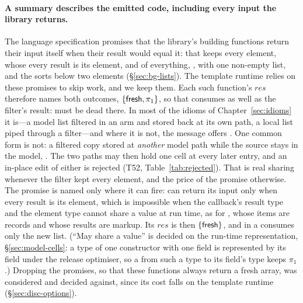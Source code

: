 \paragraph{A summary describes the emitted code, including every input the library returns.} The
language specification promises that the library's building functions return their input itself when
their result would equal it:  that keeps every element,  whose every result is
\code{===} its element,  and  of everything, ,  with
one non-empty list,  and the sorts below two elements (\S\ref{sec:bg-lists}). The template
runtime relies on these promises to skip work, and we keep them. Each such function's $\mathit{res}$
therefore names both outcomes, $\{\mathsf{fresh}, \pi_1\}$, so that  consumes
 as well as the filter's result:  must be dead there. In most of the idioms of
Chapter~\ref{sec:idioms} it is---a model list filtered in an  arm and stored back at its own
path, a local list piped through a filter---and where it is not, the message offers . One
common form is not: a filtered copy stored at \emph{another} model path while the source stays in the
model, . The two paths may then hold one cell at every
later entry, and an in-place edit of either is rejected (T52, Table~\ref{tab:rejected}). That is real
sharing whenever the filter kept every element, and the price of the promise otherwise. The promise is
named only where it can fire:  can return its input only when every result is its element, which is impossible when
the callback's result type and the element type cannot share a value at run time, as for
, whose items are records and whose results are markup. Its
$\mathit{res}$ is then $\{\mathsf{fresh}\}$, and  in a
 consumes only the new list. (``May share a value'' is decided on the run-time
representation, \S\ref{sec:model-cells}: a type of one constructor with one field is represented by its
field under the release optimiser, so a  from such a type to its field's type keeps $\pi_1$.)
Dropping the promises, so
that these functions always return a fresh array, was considered and decided against, since its cost falls on the template
runtime (\S\ref{sec:disc-options}).

